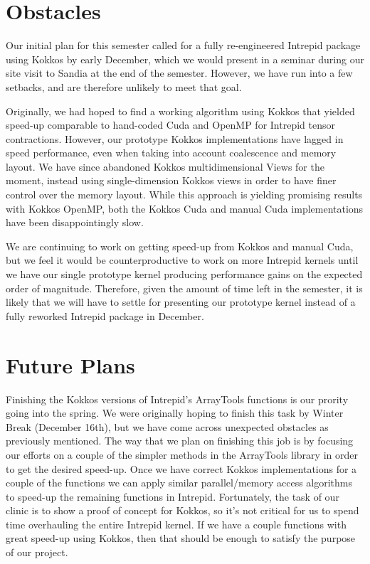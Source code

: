 \documentclass{hmcclinic}
\begin{document}
\section*{Obstacles}
Our initial plan for this semester called for a fully re-engineered Intrepid
package using Kokkos by early December, which we would present in a seminar
during our site visit to Sandia at the end of the semester.  However, we have
run into a few setbacks, and are therefore unlikely to meet that goal.

Originally, we had hoped to find a working algorithm using Kokkos that yielded
speed-up comparable to hand-coded Cuda and OpenMP for Intrepid tensor
contractions.  However, our prototype Kokkos implementations have lagged in
speed performance, even when taking into account coalescence and memory layout.
We have since abandoned Kokkos multidimensional Views for the moment, instead
using single-dimension Kokkos views in order to have finer control over the
memory layout.  While this approach is yielding promising results with Kokkos
OpenMP, both the Kokkos Cuda and manual Cuda implementations have been
disappointingly slow.

We are continuing to work on getting speed-up from Kokkos and manual Cuda, but
we feel it would be counterproductive to work on more Intrepid kernels until we
have our single prototype kernel producing performance gains on the expected
order of magnitude.  Therefore, given the amount of time left in the semester,
it is likely that we will have to settle for presenting our prototype kernel
instead of a fully reworked Intrepid package in December. 

\section*{Future Plans}
Finishing the Kokkos versions of Intrepid's ArrayTools functions is our prority
going into the spring.  We were originally hoping to finish this task by Winter
Break (December 16th), but we have come across unexpected obstacles as
previously mentioned. The way that we plan on finishing this job is by focusing
our efforts on a couple of the simpler methods in the ArrayTools library in
order to get the desired speed-up. Once we have correct Kokkos implementations
for a couple of the functions we can apply similar parallel/memory access
algorithms to speed-up the remaining functions in Intrepid. Fortunately, the
task of our clinic is to show a proof of concept for Kokkos, so it's not
critical for us to spend time overhauling the entire Intrepid kernel.  If we
have a couple functions  with great speed-up using Kokkos, then that should be
enough to satisfy the purpose of our project. 
\end{document}
